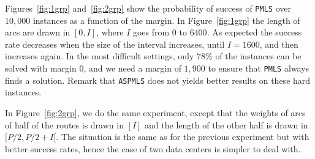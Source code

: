 \documentclass[a4paper,10pt]{article}
\newcommand\PMLS{\texttt{PMLS}\xspace}
\newcommand\ASPMLS{\texttt{ASPMLS}\xspace}
\begin{document}
  	Figures~\ref{fig:1grp} and~\ref{fig:2grp} show the probability of success of \PMLS  over $10,000$ instances as a function of the margin. In Figure~\ref{fig:1grp} the length of arcs are drawn in $[0,I]$, where $I$ goes from $0$ to $6400$. As expected the success rate decreases when the size of the interval increases, until $I = 1600$, and then increases again.  In the most difficult settings, only $78\%$ of the instances can be solved with margin $0$, and we need a margin of $1,900$ to ensure that \PMLS always finds a solution. Remark that \ASPMLS does not yields better results on these hard instances.

 	In Figure~\ref{fig:2grp}, we do the same experiment, except that the weights of arcs of half of the routes is drawn in $[I]$ and the length of the other half is drawn in $[P/2,P/2 + I[$. The situation is the same as for the previous experiment but with better success rates, hence the case of two data centers is simpler to deal with.
  
\end{document}
